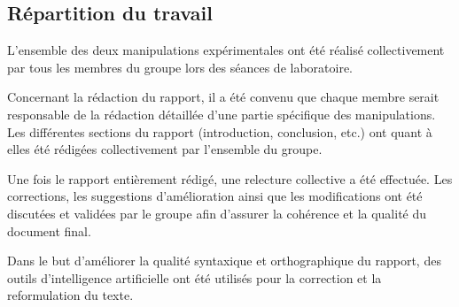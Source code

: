 \subsection{Répartition du travail}

L’ensemble des deux manipulations expérimentales ont été réalisé collectivement par tous les 
membres du groupe lors des séances de laboratoire.

Concernant la rédaction du rapport, il a été convenu que chaque membre serait responsable de la 
rédaction détaillée d’une partie spécifique des manipulations. Les différentes sections du rapport 
(introduction, conclusion, etc.) ont quant à elles été rédigées collectivement par l’ensemble du 
groupe.

Une fois le rapport entièrement rédigé, une relecture collective a été effectuée. Les corrections, les 
suggestions d’amélioration ainsi que les modifications ont été discutées et validées par le groupe afin 
d’assurer la cohérence et la qualité du document final. 

Dans le but d’améliorer la qualité syntaxique et orthographique du rapport, des outils d’intelligence 
artificielle ont été utilisés pour la correction et la reformulation du texte. 